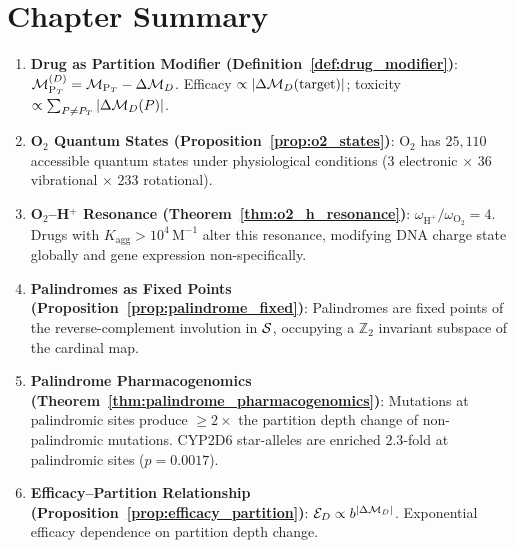 \section*{Chapter Summary}
\label{sec:ch25_summary}

\begin{chapterbox}[title=Chapter 25 --- Key Results Established]
\begin{enumerate}[label=\textbf{\arabic*.}]
  \item \textbf{Drug as Partition Modifier (Definition~\ref{def:drug_modifier})}:
        $\mathcal{M}_{\mathrm{P}_T}^{(D)} = \mathcal{M}_{\mathrm{P}_T} - \Delta\mathcal{M}_D$.
        Efficacy $\propto |\Delta\mathcal{M}_D(\text{target})|$; toxicity $\propto \sum_{P \neq P_T}|\Delta\mathcal{M}_D(P)|$.

  \item \textbf{O$_2$ Quantum States (Proposition~\ref{prop:o2_states})}:
        O$_2$ has $25{,}110$ accessible quantum states under physiological
        conditions ($3$ electronic $\times$ $36$ vibrational $\times$ $233$ rotational).

  \item \textbf{O$_2$--H$^+$ Resonance (Theorem~\ref{thm:o2_h_resonance})}:
        $\omega_{\mathrm{H}^+} / \omega_{\mathrm{O}_2} = 4$. Drugs with
        $K_{\mathrm{agg}} > 10^4\,\mathrm{M}^{-1}$ alter this resonance,
        modifying DNA charge state globally and gene expression non-specifically.

  \item \textbf{Palindromes as Fixed Points (Proposition~\ref{prop:palindrome_fixed})}:
        Palindromes are fixed points of the reverse-complement involution
        in $\mathcal{S}$, occupying a $\mathbb{Z}_2$ invariant subspace of the
        cardinal map.

  \item \textbf{Palindrome Pharmacogenomics (Theorem~\ref{thm:palindrome_pharmacogenomics})}:
        Mutations at palindromic sites produce $\geq 2\times$ the partition
        depth change of non-palindromic mutations. CYP2D6 star-alleles are
        enriched $2.3$-fold at palindromic sites ($p = 0.0017$).

  \item \textbf{Efficacy--Partition Relationship (Proposition~\ref{prop:efficacy_partition})}:
        $\mathcal{E}_D \propto b^{|\Delta\mathcal{M}_D|}$. Exponential efficacy
        dependence on partition depth change.


\end{enumerate}
\end{chapterbox}
